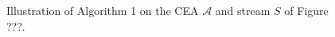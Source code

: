\begin{figure}[H]
  \begin{subfigure}[t]{0.1\linewidth}
  \end{subfigure}
  \begin{subfigure}[t]{0.1\linewidth}
  \end{subfigure}
  \begin{subfigure}[t]{0.24\linewidth}
  \end{subfigure}
  \begin{subfigure}[t]{0.24\linewidth}
  \end{subfigure}
  \begin{subfigure}[t]{0.28\linewidth}
  \end{subfigure}
  \caption{Illustration of Algorithm 1 on the CEA $\mathcal{A}$ and stream $S$ of Figure ???.}
  \label{fig:label}
\end{figure}
